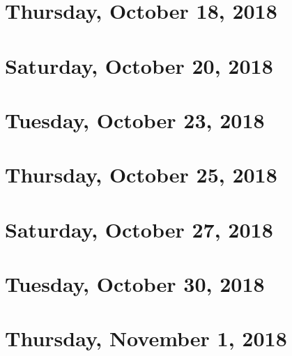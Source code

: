 \documentclass[reqno]{amsart}
\begin{document}
\section{Thursday, October 18, 2018}
    

\section{Saturday, October 20, 2018}
    
    
\section{Tuesday, October 23, 2018}
    

\section{Thursday, October 25, 2018}
    
    
\section{Saturday, October 27, 2018}
    
    
\section{Tuesday, October 30, 2018}
    
    
\section{Thursday, November 1, 2018}
    
\end{document}
